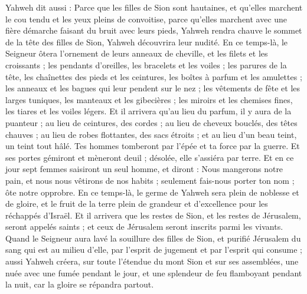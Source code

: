 \begin{multicols}{2}
Yahweh dit aussi : Parce que les filles de Sion sont hautaines, et qu'elles marchent le cou tendu et les yeux pleins de convoitise, parce qu'elles marchent avec une fière démarche faisant du bruit avec leurs pieds,
Yahweh rendra chauve le sommet de la tête des filles de Sion, Yahweh découvrira leur nudité.
En ce temps-là, le Seigneur ôtera l'ornement de leurs anneaux de cheville, et les filets et les croissants ;
les pendants d'oreilles, les bracelets et les voiles ;
les parures de la tête, les chaînettes des pieds et les ceintures, les boîtes à parfum et les amulettes ;
les anneaux et les bagues qui leur pendent sur le nez ;
les vêtements de fête et les larges tuniques, les manteaux et les gibecières ;
les miroirs et les chemises fines, les tiares et les voiles légers.
Et il arrivera qu'au lieu du parfum, il y aura de la puanteur ; au lieu de ceintures, des cordes ; au lieu de cheveux bouclés, des têtes chauves ; au lieu de robes flottantes, des sacs étroits ; et au lieu d'un beau teint, un teint tout hâlé.
Tes hommes tomberont par l'épée et ta force par la guerre.
Et ses portes gémiront et mèneront deuil ; désolée, elle s'assiéra par terre.
\VerseOne{}Et en ce jour sept femmes saisiront un seul homme, et diront : Nous mangerons notre pain, et nous nous vêtirons de nos habits ; seulement fais-nous porter ton nom ; ôte notre opprobre.
En ce temps-là, le germe de Yahweh sera plein de noblesse et de gloire, et le fruit de la terre plein de grandeur et d'excellence pour les réchappés d'Israël.
Et il arrivera que les restes de Sion, et les restes de Jérusalem, seront appelés saints ; et ceux de Jérusalem seront inscrits parmi les vivants.
Quand le Seigneur aura lavé la souillure des filles de Sion, et purifié Jérusalem du sang qui est au milieu d'elle, par l'esprit de jugement et par l'esprit qui consume ;
aussi Yahweh créera, sur toute l'étendue du mont Sion et sur ses assemblées, une nuée avec une fumée pendant le jour, et une splendeur de feu flamboyant pendant la nuit, car la gloire se répandra partout.

\end{multicols}
